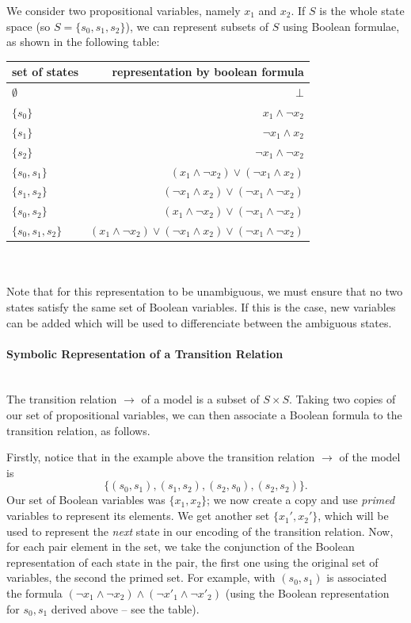 \documentclass[11pt]{article}
\newcommand{\myparagraph}[1]{\paragraph{#1}\mbox{}\\}
\begin{document}
We consider two propositional variables, namely $x_1$ and $x_2$.  
If $S$ is the whole state space (so $S = \{s_0, s_1, s_2\}$), we can represent subsets of $S$ using Boolean formulae, as shown in the following table:\\

\begin{tabular}{ l | r }
  set of states & representation by boolean formula \\ \hline
$\emptyset $&   $\bot$ \\
$\{ s_0\}$ & $x_1 \land \lnot x_2 $\\
$\{ s_1\}$ & $ \lnot x_1 \land x_2 $\\
$\{ s_2\}$ & $\lnot x_1 \land \lnot x_2 $\\
$\{ s_0, s_ 1\}$ & $(x_1 \land \lnot x_2) \lor (\lnot x_1 \land x_2)  $\\
$\{ s_1, s_2\}$ & $(\lnot x_1 \land  x_2) \lor (\lnot x_1 \land\lnot x_2)$\\
$\{ s_0, s_2\}$ & $(x_1 \land \lnot x_2) \lor (\lnot x_1 \land\lnot x_2) $\\
$\{ s_0, s_1, s_2\}$ & $(x_1 \land \lnot x_2) \lor (\lnot x_1 \land  x_2) \lor (\lnot x_1 \land\lnot x_2)$
\end{tabular}
\\
\\

Note that for this representation to be unambiguous, we must ensure that no two states satisfy the same set of Boolean variables. If this is the case, new variables can be added which will be used to differenciate between the ambiguous states.


\myparagraph{Symbolic Representation of a Transition Relation}

The transition relation $\rightarrow$ of a model is a subset of $S \times S$. Taking two copies of our set of propositional variables, we can then associate a Boolean formula to the transition relation, as follows. 

Firstly, notice that in the example above the transition relation $\rightarrow$ of the model is $$\{(s_0, s_1), (s_1, s_2), (s_2, s_0), (s_2, s_2)\}.$$
Our set of Boolean variables was $\{x_1, x_2\}$; we now create a copy and use \textit{primed} variables to represent its elements. We get another set $\{x_1', x_2'\}$, which will be used to represent the \textit{next} state in our encoding of the transition relation.
Now, for each pair element in the set, we take the conjunction of the Boolean representation of each state in the pair, the first one using the original set of variables, the second the primed set. For example, with $(s_0, s_1)$ is associated the formula $(\lnot x_1 \land \lnot x_2) \land (\lnot x'_1 \land \lnot x'_2)$ (using the Boolean representation for $s_0, s_1$ derived above -- see the table).
\end{document}
